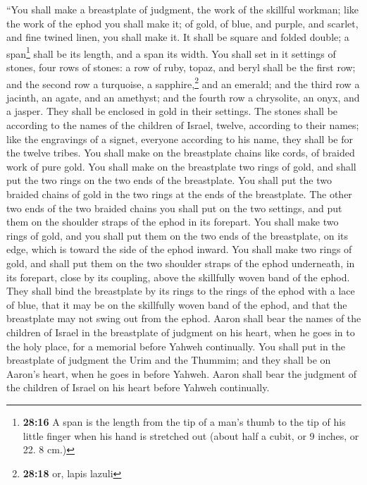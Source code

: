  ``You shall make a breastplate of judgment, the work of
the skillful workman; like the work of the ephod you shall make it; of
gold, of blue, and purple, and scarlet, and fine twined linen, you shall
make it.  It shall be square and folded double; a
span\footnote{\textbf{28:16} A span is the length from the tip of a
  man's thumb to the tip of his little finger when his hand is stretched
  out (about half a cubit, or 9 inches, or 22. 8 cm.)} shall be its
length, and a span its width.  You shall set in it
settings of stones, four rows of stones: a row of ruby, topaz, and beryl
shall be the first row;  and the second row a turquoise,
a sapphire,\footnote{\textbf{28:18} or, lapis lazuli} and an emerald;
 and the third row a jacinth, an agate, and an amethyst;
 and the fourth row a chrysolite, an onyx, and a jasper.
They shall be enclosed in gold in their settings.  The
stones shall be according to the names of the children of Israel,
twelve, according to their names; like the engravings of a signet,
everyone according to his name, they shall be for the twelve tribes.
 You shall make on the breastplate chains like cords, of
braided work of pure gold.  You shall make on the
breastplate two rings of gold, and shall put the two rings on the two
ends of the breastplate.  You shall put the two braided
chains of gold in the two rings at the ends of the breastplate.
 The other two ends of the two braided chains you shall
put on the two settings, and put them on the shoulder straps of the
ephod in its forepart.  You shall make two rings of gold,
and you shall put them on the two ends of the breastplate, on its edge,
which is toward the side of the ephod inward.  You shall
make two rings of gold, and shall put them on the two shoulder straps of
the ephod underneath, in its forepart, close by its coupling, above the
skillfully woven band of the ephod.  They shall bind the
breastplate by its rings to the rings of the ephod with a lace of blue,
that it may be on the skillfully woven band of the ephod, and that the
breastplate may not swing out from the ephod.  Aaron
shall bear the names of the children of Israel in the breastplate of
judgment on his heart, when he goes in to the holy place, for a memorial
before Yahweh continually.  You shall put in the
breastplate of judgment the Urim and the Thummim; and they shall be on
Aaron's heart, when he goes in before Yahweh. Aaron shall bear the
judgment of the children of Israel on his heart before Yahweh
continually.


